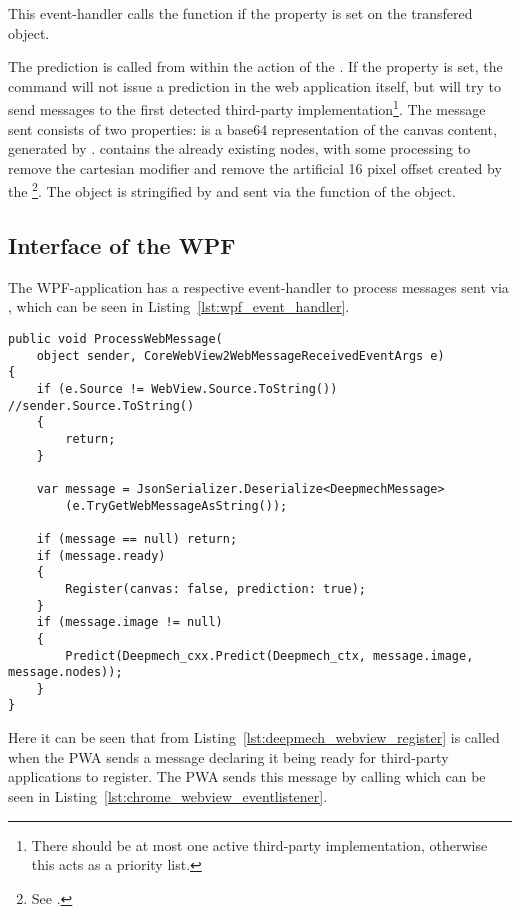 This event-handler calls the  function if the  property is set on the transfered object.

The prediction is called from within the  action of the .
If the  property is set, the  command will not issue a prediction in the web application itself, but will try to send messages to the first detected third-party implementation\footnote{There should be at most one active third-party implementation, otherwise this acts as a priority list.}.
The message sent consists of two properties:
 is a base64 representation of the canvas content, generated by .
 contains the already existing nodes, with some processing to remove the cartesian modifier and remove the artificial 16 pixel offset created by the \footnote{See .}.
The object is stringified by  and sent via the  function of the  object.

\subsection{Interface of the WPF}

The WPF-application has a respective event-handler to process messages sent via , which can be seen in Listing~\ref{lst:wpf_event_handler}.

\begin{lstlisting}[label={lst:wpf_event_handler}, caption={Event handler of the WPF-application}]
public void ProcessWebMessage(
    object sender, CoreWebView2WebMessageReceivedEventArgs e)
{
    if (e.Source != WebView.Source.ToString()) //sender.Source.ToString()
    {
        return;
    }

    var message = JsonSerializer.Deserialize<DeepmechMessage>
        (e.TryGetWebMessageAsString());

    if (message == null) return;
    if (message.ready)
    {
        Register(canvas: false, prediction: true);
    }
    if (message.image != null)
    {
        Predict(Deepmech_cxx.Predict(Deepmech_ctx, message.image, message.nodes));
    }
}
\end{lstlisting}

Here it can be seen that  from Listing~\ref{lst:deepmech_webview_register} is called when the PWA sends a message declaring it being ready for third-party applications to register.
The PWA sends this message by calling  which can be seen in Listing~\ref{lst:chrome_webview_eventlistener}.

